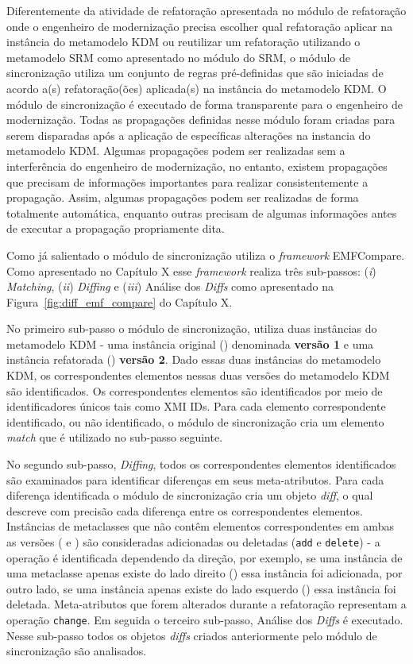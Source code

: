 Diferentemente da atividade de refatoração apresentada no módulo de refatoração onde o engenheiro de modernização precisa escolher qual refatoração aplicar na instância do metamodelo KDM ou reutilizar um refatoração utilizando o metamodelo SRM como apresentado no módulo do SRM, o módulo de sincronização utiliza um conjunto de regras pré-definidas que são iniciadas de acordo a(s) refatoração(ões) aplicada(s) na instância do metamodelo KDM. O módulo de sincronização é executado de forma transparente para o engenheiro de modernização. Todas as propagações definidas nesse módulo foram criadas para serem disparadas após a aplicação de específicas alterações na instancia do metamodelo KDM. Algumas propagações podem ser realizadas sem a interferência do engenheiro de modernização, no entanto, existem propagações que precisam de informações importantes para realizar consistentemente a propagação. Assim, algumas propagações podem ser realizadas de forma totalmente automática, enquanto outras precisam de algumas informações antes de executar a propagação propriamente dita.

Como já salientado o módulo de sincronização utiliza o \textit{framework} EMFCompare. Como apresentado no Capítulo X esse \textit{framework} realiza três sub-passos: (\textit{i}) \textit{Matching}, (\textit{ii}) \textit{Diffing} e (\textit{iii}) Análise dos \textit{Diffs} como apresentado na Figura~\ref{fig:diff_emf_compare} do Capítulo X. 

No primeiro sub-passo o módulo de sincronização, utiliza duas instâncias do metamodelo KDM - uma instância original () denominada \textbf{versão 1} e uma instância refatorada () \textbf{versão 2}. Dado essas duas instâncias do metamodelo KDM, os correspondentes elementos nessas duas versões do metamodelo KDM são identificados. Os correspondentes elementos são identificados por meio de identificadores únicos tais como XMI IDs. Para cada elemento correspondente identificado, ou não identificado, o módulo de sincronização cria um elemento \textit{match} que é utilizado no sub-passo seguinte.

No segundo sub-passo, \textit{Diffing}, todos os correspondentes elementos identificados são examinados para identificar diferenças em seus meta-atributos. Para cada diferença identificada o módulo de sincronização cria um objeto \textit{diff}, o qual descreve com precisão cada diferença entre os correspondentes elementos. Instâncias de metaclasses que não contêm elementos correspondentes em ambas as versões ( e ) são consideradas adicionadas ou deletadas (\texttt{add} e \texttt{delete}) - a operação é identificada dependendo da direção, por exemplo, se uma instância de uma metaclasse apenas existe do lado direito () essa instância foi adicionada, por outro lado, se uma instância apenas existe do lado esquerdo () essa instância foi deletada. Meta-atributos que forem alterados durante a refatoração representam a operação \texttt{change}. Em seguida o terceiro sub-passo, Análise dos \textit{Diffs} é executado. Nesse sub-passo todos os objetos \textit{diffs} criados anteriormente pelo módulo de sincronização são analisados.

